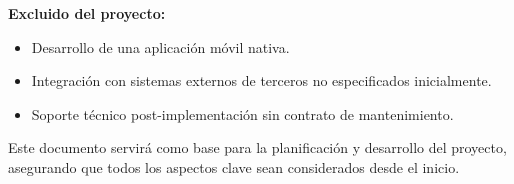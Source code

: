 \textbf{Excluido del proyecto:}
\begin{itemize}
	\item Desarrollo de una aplicación móvil nativa.
	\item Integración con sistemas externos de terceros no especificados inicialmente.
	\item Soporte técnico post-implementación sin contrato de mantenimiento.
\end{itemize}

Este documento servirá como base para la planificación y desarrollo del proyecto, asegurando que todos los aspectos clave sean considerados desde el inicio.

